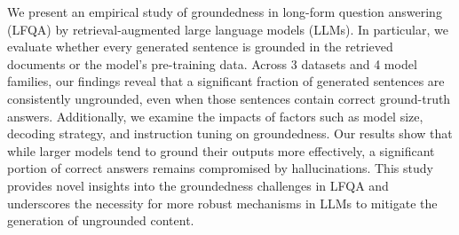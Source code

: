 We present an empirical study of groundedness in long-form question answering (LFQA) by retrieval-augmented  large language models (LLMs). In particular, we evaluate whether every generated sentence is grounded in the retrieved documents or the model's pre-training data. Across 3 datasets and 4 model families, our findings reveal that a significant fraction of generated sentences are consistently ungrounded, even when those sentences contain correct ground-truth answers. Additionally, we examine the impacts of factors such as model size, decoding strategy, and instruction tuning on groundedness. Our results show that while larger models tend to ground their outputs more effectively, a significant portion of correct answers remains compromised by hallucinations. This study provides novel insights into the groundedness challenges in LFQA and underscores the necessity for more robust mechanisms in LLMs to mitigate the generation of ungrounded content.